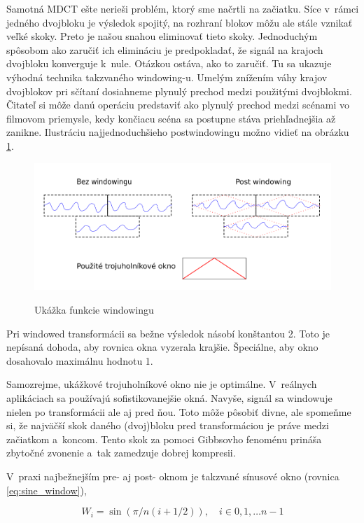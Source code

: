 Samotná MDCT ešte nerieši problém, ktorý sme načrtli na začiatku.
Síce v~rámci jedného dvojbloku je výsledok spojitý,
na rozhraní blokov môžu ale stále vznikať veľké skoky.
Preto je našou snahou eliminovať tieto skoky. Jednoduchým spôsobom ako
zaručiť ich elimináciu je predpokladať, že signál na krajoch dvojbloku
konverguje k~nule. Otázkou ostáva, ako to zaručiť. Tu sa ukazuje
výhodná technika takzvaného windowing-u. Umelým znížením váhy krajov
dvojblokov pri sčítaní dosiahneme plynulý prechod medzi použitými
dvojblokmi. Čitateľ si môže danú operáciu predstaviť ako plynulý
prechod medzi scénami vo filmovom priemysle, kedy končiacu scéna
sa postupne stáva priehľadnejšia až zanikne.
Ilustráciu najjednoduchšieho postwindowingu možno vidieť na obrázku
\ref{fig:post_windowing}.
\begin{figure}[htp]
    \centering
    \includegraphics{obrazky/informatika/audio/post_windowing}
    \label{fig:post_windowing}
    \caption{Ukážka funkcie windowingu}
\end{figure}

\begin{poznamka}
    Pri windowed transformácii sa bežne výsledok násobí konštantou 2.
    Toto je nepísaná dohoda, aby rovnica okna vyzerala krajšie.
    Špeciálne, aby okno dosahovalo maximálnu hodnotu 1.
\end{poznamka}
Samozrejme, ukážkové trojuholníkové okno nie je optimálne.
V~reálnych aplikáciach sa používajú sofistikovanejšie okná.
Navyše, signál sa windowuje nielen po transformácii ale aj pred ňou. Toto
môže pôsobiť divne, ale spomeňme si, že najväčší skok daného
(dvoj)bloku pred transformáciou je práve medzi začiatkom a~koncom.
Tento skok za pomoci Gibbsovho fenoménu prináša zbytočné zvonenie 
a~tak zamedzuje dobrej kompresii.

V~praxi najbežnejším pre- aj post- oknom je takzvané sínusové okno
(rovnica \eqref{eq:sine_window}),

\begin{equation}
    W_i = \sin(\pi/n (i + 1/2)),\quad  i\in 0,1,\dots n-1
    \label{eq:sine_window}
\end{equation}

